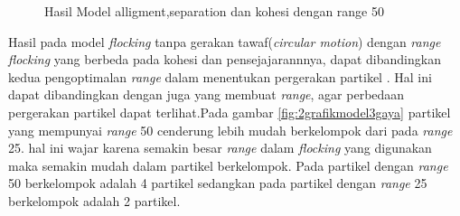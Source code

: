 \begin{figure}
\centering
{}
\hfill
{}

\caption{Hasil Model alligment,separation dan kohesi dengan range 50}
\label{fig:2grafikmodel3gaya2}

\end{figure}
Hasil pada model \textit{flocking} tanpa gerakan tawaf(\textit{circular motion}) dengan \textit{range} \textit{flocking} yang berbeda pada kohesi dan pensejajarannnya, dapat dibandingkan kedua pengoptimalan \textit{range} dalam menentukan pergerakan partikel . Hal ini dapat dibandingkan dengan \citep{HUTH1992} juga yang membuat \textit{range}, agar perbedaan pergerakan partikel dapat terlihat.Pada gambar \ref{fig:2grafikmodel3gaya} partikel yang mempunyai \textit{range} 50 cenderung lebih mudah berkelompok  dari pada \textit{range} 25. hal ini wajar karena semakin besar \textit{range} dalam \textit{flocking} yang digunakan maka semakin mudah dalam partikel berkelompok. Pada partikel dengan \textit{range} 50 berkelompok adalah 4 partikel sedangkan pada partikel dengan \textit{range} 25 berkelompok adalah 2 partikel. 

